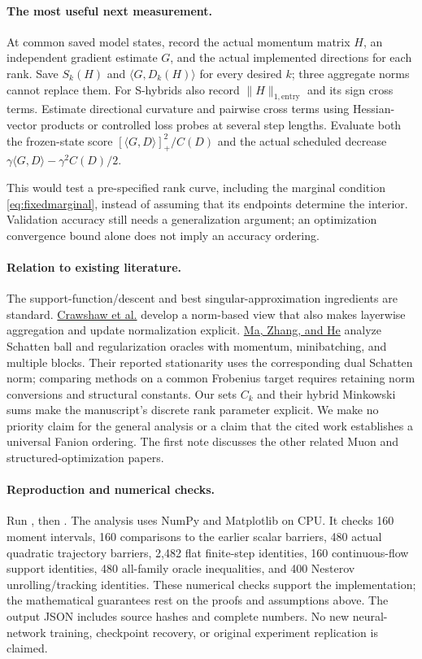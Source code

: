 \documentclass[11pt]{article}
\newcommand{\ip}[2]{\langle #1,#2\rangle}
\newcommand{\ent}[1]{\lVert #1\rVert_{1,\mathrm{entry}}}
\newcommand{\pos}[1]{[#1]_+}
\begin{document}
\paragraph{The most useful next measurement.}
At common saved model states, record the actual momentum matrix $H$,
an independent gradient estimate $G$, and the actual implemented directions
for each rank. Save $S_k(H)$ and $\ip{G}{D_k(H)}$ for every desired $k$;
three aggregate norms cannot replace them. For S-hybrids also record
$\ent{H}$ and its sign cross terms. Estimate directional curvature and
pairwise cross terms using Hessian-vector products or controlled loss probes
at several step lengths. Evaluate both the frozen-state score
$\pos{\ip{G}{D}}^2/C(D)$ and the actual scheduled decrease
$\gamma\ip{G}{D}-\gamma^2C(D)/2$.

This would test a pre-specified rank curve, including the marginal condition
\eqref{eq:fixedmarginal}, instead of assuming that its endpoints determine
the interior. Validation accuracy still needs a generalization argument;
an optimization convergence bound alone does not imply an accuracy ordering.

\paragraph{Relation to existing literature.}
The support-function/descent and best singular-approximation ingredients are
standard. \href{https://arxiv.org/html/2510.09827}{Crawshaw et al.} develop a norm-based view that
also makes layerwise aggregation and update normalization explicit.
\href{https://arxiv.org/html/2606.15702v1}{Ma, Zhang, and He} analyze Schatten ball and regularization
oracles with momentum, minibatching, and multiple blocks. Their reported
stationarity uses the corresponding dual Schatten norm; comparing methods
on a common Frobenius target requires retaining norm conversions and
structural constants. Our sets $C_k$ and their hybrid Minkowski sums make
the manuscript's discrete rank parameter explicit. We make no priority
claim for the general analysis or a claim that the cited work establishes
a universal Fanion ordering. The first note discusses the other related
Muon and structured-optimization papers.

\paragraph{Reproduction and numerical checks.}
Run , then
.
The analysis uses NumPy and Matplotlib on CPU. It checks 160 moment
intervals, 160 comparisons to the earlier scalar barriers, 480 actual
quadratic trajectory barriers, 2,482 flat finite-step identities, 160
continuous-flow support identities, 480 all-family oracle inequalities,
and 400 Nesterov unrolling/tracking identities. These numerical checks
support the implementation; the mathematical guarantees rest on the proofs
and assumptions above. The output JSON includes source hashes and complete
numbers. No new neural-network training, checkpoint recovery, or original
experiment replication is claimed.
\end{document}
